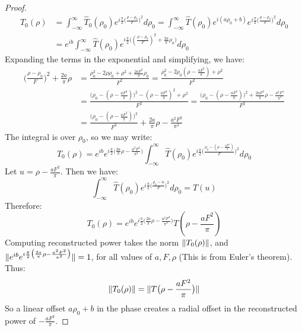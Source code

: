 \documentclass{article}
\theoremstyle{mystyle}
\DeclarePairedDelimiter\norm{\lVert}{\rVert}
\begin{document}
\begin{proof}
\begin{align*}
T_0(\rho) &=\int_{-\infty}^{\infty} \hat{T}_{0}(\rho_0)e^{i\frac{\pi}{2}\big(\frac{\rho-\rho_0}{F}\big)^2}d\rho_0=\int_{-\infty}^{\infty}\hat{T}(\rho_0)e^{i(a\rho_0+b)}e^{i\frac{\pi}{2}\big(\frac{\rho - \rho_0}{F}\big)^2}d\rho_0\\&= e^{ib}\int_{-\infty}^{\infty}\hat{T}(\rho_0)e^{i\frac{\pi}{2}\big((\frac{\rho-\rho_0}{F})^2 + \frac{2a}{\pi}\rho_0\big)}d\rho_0
\end{align*}
Expanding the terms in the exponential and simplifying, we have:
\begin{align*}
    \big(\frac{\rho-\rho_0}{F}\big)^2 + \frac{2a}{\pi}\rho &= \frac{\rho_0^2 - 2\rho\rho_0 + \rho^2 + \frac{2aF^2}{\pi}\rho_0}{F^2}= \frac{\rho_0^2 - 2\rho_0(\rho - \frac{aF^2}{\pi}) + \rho^2}{F^2}\\
    &= \frac{\big(\rho_0 - (\rho - \frac{aF^2}{\pi})\big)^2 - (\rho - \frac{aF^2}{\pi})^2 + \rho^2}{F^2}= \frac{\big(\rho_0 - (\rho-\frac{aF^2}{\pi})\big)^2 +\frac{2aF^2}{\pi}\rho - \frac{a^2F^4}{\pi^2}}{F^2}\\
    &= \frac{\big(\rho_0 - (\rho-\frac{aF^2}{\pi})\big)^2}{F^2} + \frac{2a}{\pi}\rho - \frac{a^2F^2}{\pi^2}
\end{align*}
The integral is over $\rho_0$, so we may write:
\begin{equation*}
T_0(\rho) = e^{ib}e^{i\frac{\pi}{2}\big(\frac{2a}{\pi}\rho - \frac{a^2F^2}{\pi^2}\big)}\int_{-\infty}^{\infty} \hat{T}(\rho_0)e^{i\frac{\pi}{2}\big(\frac{\rho_0 - (\rho - \frac{aF^2}{\pi})}{F}\big)^2}d\rho_0
\end{equation*}
Let $u = \rho - \frac{aF^2}{\pi}$. Then we have:
\begin{equation*}
\int_{-\infty}^{\infty} \hat{T}(\rho_0)e^{i\frac{\pi}{2}\big(\frac{\rho_0 - u}{F}\big)^2}d\rho_0 = T(u)
\end{equation*}
Therefore:
\begin{equation*}
T_0(\rho) = e^{ib}e^{i\frac{\pi}{2}\big(\frac{2a}{\pi}\rho - \frac{a^2F^2}{\pi^2}\big)}T(\rho - \frac{aF^2}{\pi})
\end{equation*}
Computing reconstructed power takes the norm $\norm{T_{0}(\rho)}$, and $\norm{e^{ib}e^{i\frac{\pi}{2}\big(\frac{2a}{\pi}\rho - \frac{a^2F^2}{\pi^2}\big)}} = 1$, for all values of $a,F, \rho$ (This is from Euler's theorem). Thus:
\begin{equation*}
    \norm{T_{0}(\rho)} = \norm{T\big(\rho - \frac{aF^2}{\pi}\big)}    
\end{equation*}
So a linear offset $a\rho_0+b$ in the phase creates a radial offset in the reconstructed power of $-\frac{aF^2}{\pi}$.
\end{proof}
\end{document}
